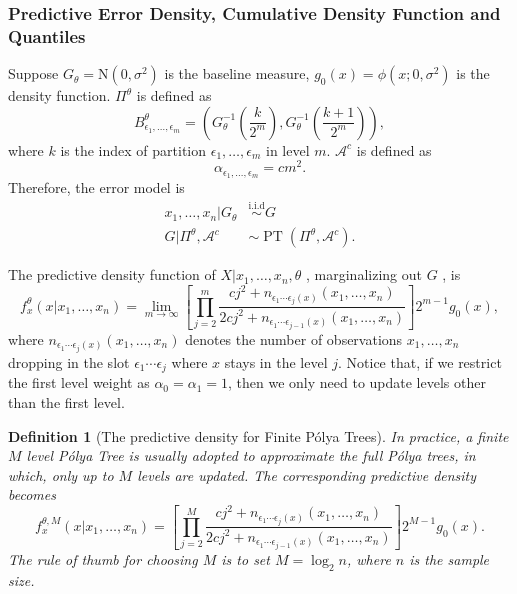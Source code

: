 \documentclass[12pt]{article}
\newtheorem{deff}[thm]{Definition}
\newcommand{\polya}{P\'{o}lya}
\newcommand{\iid}{\stackrel{\text{i.i.d}}{\sim}}
\DeclareMathOperator{\pt}{PT}
\begin{document}
\subsubsection{Predictive Error Density, Cumulative Density Function
  and Quantiles}
Suppose $G_{\theta} = \mathrm{N}(0, \sigma^2)$ is the baseline
measure, $g_0(x) = \phi(x; 0, \sigma^2)$ is the density
function. $\Pi^{\theta}$ is defined as
\begin{displaymath}
B^{\theta}_{\epsilon_1, \ldots, \epsilon_m} = \left( G^{-1}_{\theta}
  \left( \frac{k}{2^m} \right) , G^{-1}_{\theta}\left( \frac{k+1}{2^m} \right) \right),
\end{displaymath}
where $k$ is the index of partition $\epsilon_1, \ldots, \epsilon_m$
in level $m$. $\mathcal{A}^c$ is defined as 
\begin{displaymath}
\alpha_{\epsilon_1, \ldots, \epsilon_m} = cm^2.
\end{displaymath}
Therefore, the error model is 
\begin{align*}
x_1, \ldots, x_n |G_{\theta} & \iid G\\
G|\Pi^{\theta}, \mathcal{A}^{c} & \sim \pt (\Pi^{\theta},
\mathcal{A}^{c}). 
\end{align*}

The predictive density function of $X|x_1, \ldots, x_n, \theta$ ,
marginalizing out $G$ , is  
\begin{equation}
\label{eq:4}
f_x^{\theta} (x|x_1, \ldots, x_n)  = \lim_{m \to \infty} \left[
  \prod_{j=2}^m \frac{cj^2 + n_{\epsilon_1 \cdots \epsilon_j(x) }(x_1 , \ldots, x_n)}{2cj^2
  + n_{\epsilon_1 \cdots \epsilon_{j-1}(x)}(x_1, \ldots, x_n)}
\right]2^{m-1} g_0(x),
\end{equation}
where $n_{\epsilon_1 \cdots \epsilon_j(x) }(x_1 , \ldots, x_n)$
denotes the number of observations $x_1, \ldots, x_n$ dropping in the
slot $\epsilon_1 \cdots \epsilon_j$ where $x$ stays in the level
$j$. Notice that, if  we restrict the first level weight as
$\alpha_0=\alpha_1=1$, then we only need to update levels other than
the first level.

\begin{deff}[The predictive density for Finite \polya{} Trees]
In practice, a finite $M$ level \polya{} Tree is usually adopted to
approximate the full \polya{} trees, in which, only up to $M$ levels are
updated. The corresponding predictive density becomes 
\begin{equation}
\label{eq:5}
f_x^{\theta, M} (x|x_1, \ldots, x_n)  =  \left[
  \prod_{j=2}^M \frac{cj^2 + n_{\epsilon_1 \cdots \epsilon_j(x) }(x_1 , \ldots, x_n)}{2cj^2
  + n_{\epsilon_1 \cdots \epsilon_{j-1}(x)}(x_1, \ldots, x_n)}
\right]2^{M-1} g_0(x).
\end{equation}
The rule of thumb for choosing $M$ is to set $M=\log_2n$, where $n$ is
the sample size.
\end{deff}
\end{document}
